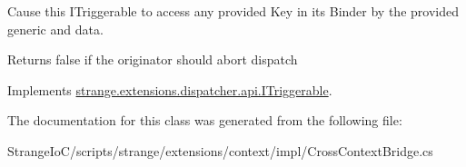 Cause this I\-Triggerable to access any provided Key in its Binder by the provided generic and data. 

\begin{DoxyReturn}{Returns}
false if the originator should abort dispatch
\end{DoxyReturn}


Implements \hyperlink{interfacestrange_1_1extensions_1_1dispatcher_1_1api_1_1_i_triggerable_ab51a637635cbd1819f5d33f00831c8d5}{strange.\-extensions.\-dispatcher.\-api.\-I\-Triggerable}.



The documentation for this class was generated from the following file\-:\begin{DoxyCompactItemize}
\item 
Strange\-Io\-C/scripts/strange/extensions/context/impl/Cross\-Context\-Bridge.\-cs\end{DoxyCompactItemize}

